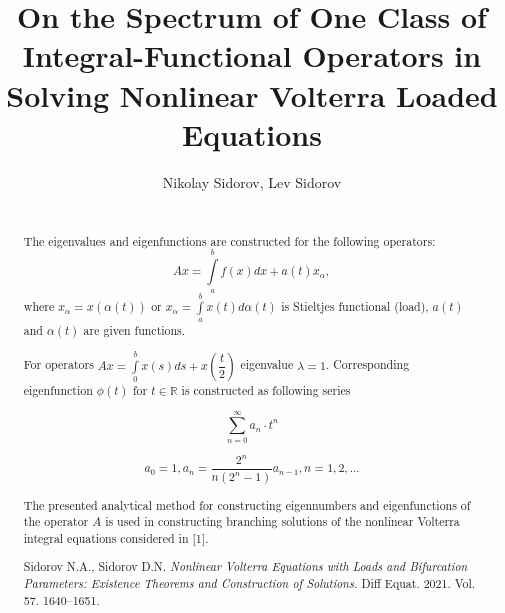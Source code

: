 \begin{englishtitle}
\title{On the Spectrum of One Class of Integral-Functional Operators in Solving  Nonlinear Volterra  Loaded Equations}
\author{Nikolay Sidorov, 
             Lev Sidorov}

\maketitle

\begin{abstract}
	


~\\

The eigenvalues and eigenfunctions are constructed for the following operators:
$$ Ax = \int\limits_a^b f(x)dx + a(t)x_{\alpha},$$
where  $x_{\alpha} = x ( \alpha (t))$  or  $x_{\alpha} = \int\limits_a^bx(t)d\alpha(t)$  is Stieltjes functional  (load), $a(t)$ and  $\alpha(t)$ 
are given functions.



\begin{example}
	For operators $Ax = \int\limits_0^bx(s)ds + x(\dfrac{t}{2})$  eigenvalue $\lambda = 1$.  Corresponding eigenfunction  $\phi(t)$  for  $ t \in \mathbb{R}$  is constructed as following series
	
	$$\sum_{n=0}^{\infty} a_n\cdot t^n$$
	
	$$a_{0} = 1, a_{n} = \frac{2^{n}}{n(2^{n}-1)}a_{n-1}, n = 1, 2, ...$$
\end{example}


The presented analytical method for constructing eigennumbers and eigenfunctions of the operator $A$ is used in constructing branching solutions of the nonlinear Volterra integral equations considered in [1].

\begin{thebibliography}{99}
	Sidorov N.A., Sidorov D.N.  {\it Nonlinear Volterra Equations with Loads and Bifurcation Parameters: Existence Theorems and Construction of Solutions.} Diff Equat. 2021.  Vol. 57. 1640--1651.
	
\end{thebibliography}

\end{abstract}
\end{englishtitle}

